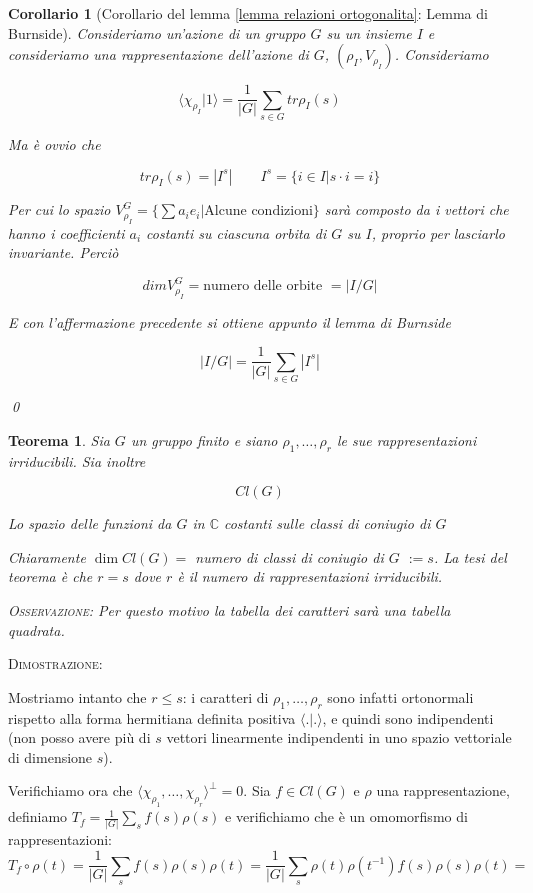 \documentclass[11pt]{article}
\theoremstyle{plain}
\newtheorem{thm}{Teorema}[section]
\newtheorem*{cor}{Corollario}
\theoremstyle{definition}
\theoremstyle{remark}
\newcommand{\C}{\mathbb{C}}
\newcommand{\dsum}{\displaystyle\sum}
\begin{document}
\begin{cor}[Corollario del lemma \ref{lemma relazioni ortogonalita}: Lemma di Burnside]

Consideriamo un'azione di un gruppo $G$ su un insieme $I$ e consideriamo una rappresentazione dell'azione di $G$, $(\rho_I, V_{\rho_I})$. Consideriamo

\[\langle \chi_{\rho_I} | 1 \rangle = \dfrac{1}{|G|} \dsum_{s\in G} tr \rho_I(s)\]

Ma è ovvio che 

\[tr \rho_I(s) = |I^s| \qquad I^s = \{ i \in I | s \cdot i = i\} \]

Per cui lo spazio $V_{\rho_I}^G = \{\dsum a_i e_i | \text{Alcune condizioni}\}$ sarà composto da i vettori che hanno i coefficienti $a_i$ costanti su ciascuna orbita di $G$ su $I$, proprio per lasciarlo invariante. Perciò 

\[ dimV_{\rho_I}^G = \text{numero delle orbite } = |I/G|\]

E con l'affermazione precedente si ottiene appunto il lemma di Burnside

\[ |I/G| = \dfrac{1}{|G|} \dsum_{s\in G} |I^s|\]

\qed
\end{cor}



\begin{thm} Sia $G$ un gruppo finito e siano $\rho_1, \ldots , \rho_r$ le sue rappresentazioni irriducibili. Sia inoltre 

\[Cl(G)  \]

Lo spazio delle funzioni da $G$ in $\C$ costanti sulle classi di coniugio di $G$

Chiaramente $\dim Cl(G) = $ numero di classi di coniugio di $G$ $:= s$. La tesi del teorema è che $r = s$ 
dove $r$ è il numero di rappresentazioni irriducibili. 

\textsc{Osservazione:} Per questo motivo la tabella dei caratteri sarà una tabella quadrata.

\end{thm}

\textsc{Dimostrazione:}
 
Mostriamo intanto che $r \leq s$: i caratteri di $\rho_1, \ldots , \rho_r$ sono infatti ortonormali rispetto alla forma hermitiana
definita positiva $\langle . | .\rangle$, e quindi sono indipendenti (non posso avere più di $s$ vettori linearmente indipendenti 
in uno spazio vettoriale di dimensione $s$).

Verifichiamo ora che $\langle \chi_{\rho_1}, \ldots, \chi_{\rho_r} \rangle ^{\perp} = {0}$. Sia $f \in Cl(G)$ e $\rho$ una rappresentazione,
definiamo $T_f= \frac{1}{|G|}\dsum_s f(s)\rho(s)$ e verifichiamo che è un omomorfismo di rappresentazioni: 
$$ T_f \circ \rho(t) = \frac{1}{|G|}\dsum_s f(s)\rho(s) \rho(t) = \frac{1}{|G|}\dsum_s \rho(t) \rho(t^{-1}) f(s)\rho(s) \rho(t) =$$
\end{document}
